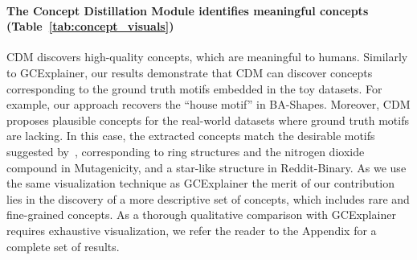 \paragraph{The Concept Distillation Module identifies meaningful concepts (Table~\ref{tab:concept_visuals})}
CDM discovers high-quality concepts, which are meaningful to humans. Similarly to GCExplainer, our results demonstrate that CDM can discover concepts corresponding to the ground truth motifs embedded in the toy datasets. For example, our approach recovers the ``house motif'' in BA-Shapes. Moreover, CDM proposes plausible concepts for the real-world datasets where ground truth motifs are lacking. In this case, the extracted concepts match the desirable motifs suggested by~\citet{ying2019gnnexplainer}, corresponding to ring structures and the nitrogen dioxide compound in Mutagenicity, and a star-like structure in Reddit-Binary. 
As we use the same visualization technique as GCExplainer the merit of our contribution lies in the discovery of a more descriptive set of concepts, which includes rare and fine-grained concepts. As a thorough qualitative comparison with GCExplainer requires exhaustive visualization, we refer the reader to the Appendix for a complete set of results.






